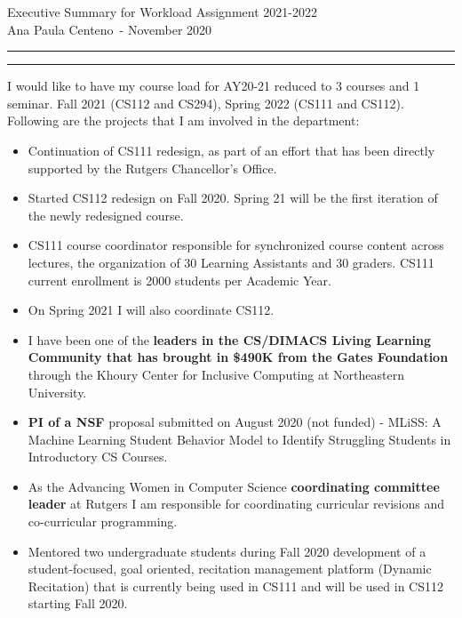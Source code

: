 \documentclass[11pt]{article}
\newcommand{\soptitle}{Executive Summary for Workload Assignment 2021-2022}
\newcommand{\yourname}{Ana Paula Centeno}
\begin{document}
\begin{center}\LARGE\soptitle\\
\large \yourname\ - November 2020
\end{center}

\hrule
\vspace{1pt}
\hrule height 1pt

\bigskip
\bigskip

I would like to have my course load for AY20-21 reduced to 3 courses
and 1 seminar. Fall 2021 (CS112 and CS294), Spring 2022 (CS111 and
CS112).  Following are the projects that I am involved in the
department:

\bigskip

\begin{itemize}

  \item Continuation of CS111 redesign, as part of an effort that has
    been directly supported by the Rutgers Chancellor's Office.

  \item Started CS112 redesign on Fall 2020. Spring 21 will be the
    first iteration of the newly redesigned course.

  \item CS111 course coordinator responsible for synchronized course
    content across lectures, the organization of 30 Learning
    Assistants and 30 graders. CS111 current enrollment is 2000
    students per Academic Year.

  \item On Spring 2021 I will also coordinate CS112.

  \item I have been one of the {\bf leaders in the CS/DIMACS Living
    Learning Community that has brought in \$490K from the Gates
    Foundation} through the Khoury Center for Inclusive Computing at
    Northeastern University.

  \item {\bf PI of a NSF} proposal submitted on August 2020 (not funded) -
    MLiSS: A Machine Learning Student Behavior Model to Identify
    Struggling Students in Introductory CS Courses.
    
  \item As the Advancing Women in Computer Science {\bf coordinating
    committee leader} at Rutgers I am responsible for coordinating
    curricular revisions and co-curricular programming.
    
  \item Mentored two undergraduate students during Fall 2020
    development of a student-focused, goal oriented, recitation
    management platform (Dynamic Recitation) that is currently being
    used in CS111 and will be used in CS112 starting Fall 2020.
    

\end{itemize}
\end{document}
